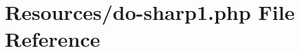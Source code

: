 \hypertarget{do-sharp1_8php}{}\section{Resources/do-\/sharp1.php File Reference}
\label{do-sharp1_8php}
